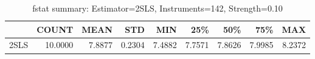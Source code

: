 \begin{table}[ht]
\centering
\caption{fstat summary: Estimator=2SLS, Instruments=142, Strength=0.10}
\begin{tabular}{lrrrrrrrr}
\toprule
 & COUNT & MEAN & STD & MIN & 25\% & 50\% & 75\% & MAX \\
\midrule
2SLS & 10.0000 & 7.8877 & 0.2304 & 7.4882 & 7.7571 & 7.8626 & 7.9985 & 8.2372 \\
\bottomrule
\end{tabular}
\end{table}
